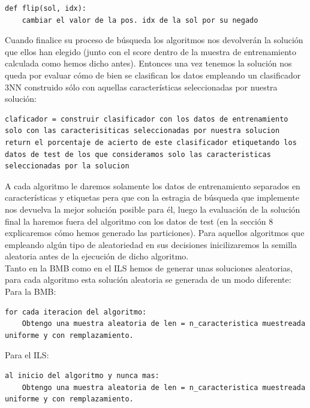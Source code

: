 \documentclass[10pt,a4paper]{article}
\begin{document}
\begin{lstlisting}
def flip(sol, idx):
	cambiar el valor de la pos. idx de la sol por su negado
\end{lstlisting}

Cuando finalice su proceso de búsqueda los algoritmos nos devolverán la solución que ellos han elegido (junto con el score dentro de la muestra de entrenamiento calculada como hemos dicho antes). Entonces una vez tenemos la solución nos queda por evaluar cómo de bien se clasifican los datos empleando un clasificador 3NN construido sólo con aquellas características seleccionadas por nuestra solución:\\

\begin{lstlisting}
claficador = construir clasificador con los datos de entrenamiento solo con las caracterisiticas seleccionadas por nuestra solucion
return el porcentaje de acierto de este clasificador etiquetando los datos de test de los que consideramos solo las caracteristicas seleccionadas por la solucion
\end{lstlisting}

A cada algoritmo le daremos solamente los datos de entrenamiento separados en características y etiquetas pera que con la estragia de búsqueda que implemente nos devuelva la mejor solución posible para él, luego la evaluación de la solución final la haremos fuera del algoritmo con los datos de test (en la sección 8 explicaremos cómo hemos generado las particiones). Para aquellos algoritmos que empleando algún tipo de aleatoriedad en sus decisiones inicilizaremos la semilla aleatoria antes de la ejecución de dicho algoritmo.\\

Tanto en la BMB como en el ILS hemos de generar unas soluciones aleatorias, para cada algoritmo esta solución aleatoria se generada de un modo diferente:\\

Para la BMB:\\

\begin{lstlisting}
for cada iteracion del algoritmo:
	Obtengo una muestra aleatoria de len = n_caracteristica muestreada uniforme y con remplazamiento.
\end{lstlisting}

Para el ILS:\\

\begin{lstlisting}
al inicio del algoritmo y nunca mas:
	Obtengo una muestra aleatoria de len = n_caracteristica muestreada uniforme y con remplazamiento.
\end{lstlisting}
\end{document}
